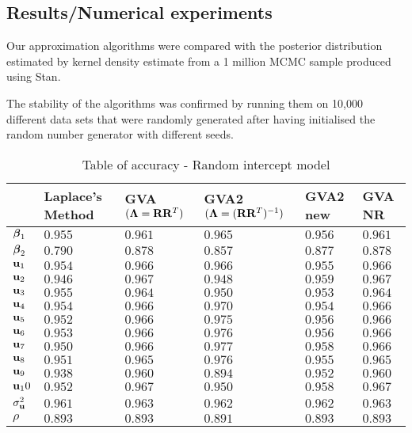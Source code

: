 \documentclass{article}[12pt]
\begin{document}

\subsection{Results/Numerical experiments}\label{sec:results}

Our approximation algorithms were compared with the posterior distribution estimated
by kernel density estimate from a 1 million MCMC sample produced using Stan.

\noindent The stability of the algorithms was confirmed by running them on 10,000 
different data sets that were randomly generated after having initialised the random 
number generator with different seeds.

\begin{table}
\label{tab:accuracy_int}
\caption{Table of accuracy - Random intercept model}
\begin{tabular}{l|lllll}
\hline
& Laplace's Method & GVA $({\boldsymbol \Lambda} = {\bf R} {\bf R}^T)$ & GVA2 $({\boldsymbol \Lambda} = ({\bf R} {\bf R}^T)^{-1})$ & GVA2 new & GVA NR\\
\hline
${\boldsymbol \beta}_1$ & $0.955$ & $0.961$ & $0.965$ & $0.956$ & $0.961$ \\ 
${\boldsymbol \beta}_2$ & $0.790$ & $0.878$ & $0.857$ & $0.877$ & $0.878$ \\ 
${\bf u}_1$ & $0.954$ & $0.966$ & $0.966$ & $0.955$ & $0.966$ \\ 
${\bf u}_2$ & $0.946$ & $0.967$ & $0.948$ & $0.959$ & $0.967$ \\ 
${\bf u}_3$ & $0.955$ & $0.964$ & $0.950$ & $0.953$ & $0.964$ \\ 
${\bf u}_4$ & $0.954$ & $0.966$ & $0.970$ & $0.954$ & $0.966$ \\ 
${\bf u}_5$ & $0.952$ & $0.966$ & $0.975$ & $0.956$ & $0.966$ \\ 
${\bf u}_6$ & $0.953$ & $0.966$ & $0.976$ & $0.956$ & $0.966$ \\ 
${\bf u}_7$ & $0.950$ & $0.966$ & $0.977$ & $0.958$ & $0.966$ \\ 
${\bf u}_8$ & $0.951$ & $0.965$ & $0.976$ & $0.955$ & $0.965$ \\ 
${\bf u}_9$ & $0.938$ & $0.960$ & $0.894$ & $0.952$ & $0.960$ \\ 
${\bf u}_10$ & $0.952$ & $0.967$ & $0.950$ & $0.958$ & $0.967$ \\ 
$\sigma^2_{\bf u}$ & $0.961$ & $0.963$ & $0.962$ & $0.962$ & $0.963$ \\ 
$\rho$ & $0.893$ & $0.893$ & $0.891$ & $0.893$ & $0.893$ \\ 
\hline
\end{tabular}
\end{table}
\end{document}
